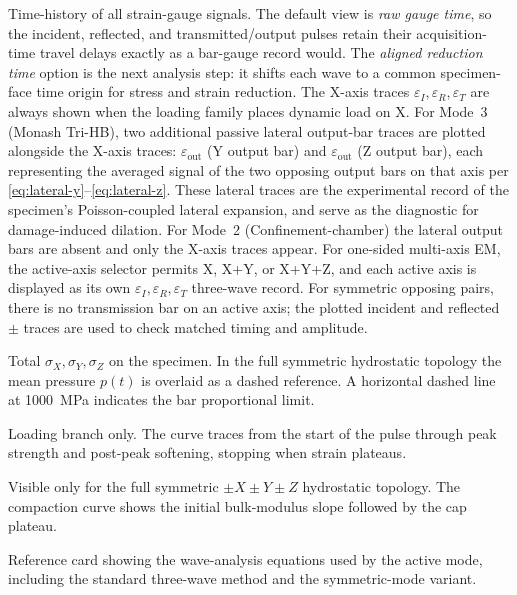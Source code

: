 \documentclass[11pt,a4paper,openany]{book}
\providecommand{\SI}[2]{\qty{#1}{#2}}
\theoremstyle{handbook}
\newcommand{\sig}{\sigma}
\newcommand{\eps}{\varepsilon}
\begin{document}
\begin{description}[leftmargin=2em,style=nextline]
  \item[Bar waveforms] Time-history of all strain-gauge signals. The
    default view is \emph{raw gauge time}, so the incident, reflected, and
    transmitted/output pulses retain their acquisition-time travel delays
    exactly as a bar-gauge record would. The \emph{aligned reduction time}
    option is the next analysis step: it shifts each wave to a common
    specimen-face time origin for stress and strain reduction. The X-axis
    traces $\eps_I,\eps_R,\eps_T$ are always shown when the loading family
    places dynamic load on X. For Mode~3 (Monash Tri-HB),
    two additional passive lateral output-bar traces are plotted
    alongside the X-axis traces: $\eps_{\text{out}}$ (Y output bar) and
    $\eps_{\text{out}}$ (Z output bar), each representing the averaged
    signal of the two opposing output bars on that axis per
    \eqref{eq:lateral-y}--\eqref{eq:lateral-z}. These lateral traces are
    the experimental record of the specimen's Poisson-coupled lateral
    expansion, and serve as the diagnostic for damage-induced dilation.
    For Mode~2 (Confinement-chamber) the lateral output bars are absent
    and only the X-axis traces appear. For one-sided multi-axis EM, the
    active-axis selector permits X, X+Y, or X+Y+Z, and each active axis is
    displayed as its own $\eps_I,\eps_R,\eps_T$ three-wave record. For
    symmetric opposing pairs, there is no transmission bar on an active
    axis; the plotted incident and reflected $\pm$ traces are used to check
    matched timing and amplitude.
  \item[Specimen stresses] Total $\sig_X,\sig_Y,\sig_Z$ on the specimen.
    In the full symmetric hydrostatic topology the mean pressure $p(t)$ is
    overlaid as a dashed reference. A horizontal dashed line at
    \SI{1000}{MPa} indicates the bar proportional limit.
  \item[$\sig$--$\eps$ curve] Loading branch only. The curve traces from
    the start of the pulse through peak strength and post-peak softening,
    stopping when strain plateaus.
  \item[$p$--$\eps_v$] Visible only for the full symmetric
    $\pm X\pm Y\pm Z$ hydrostatic topology. The compaction curve shows the
    initial bulk-modulus slope followed by the cap plateau.
  \item[Equations] Reference card showing the wave-analysis equations
    used by the active mode, including the standard three-wave method
    and the symmetric-mode variant.
\end{description}
\end{document}
